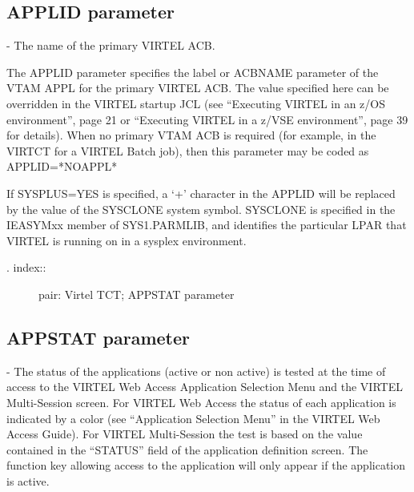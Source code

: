 \documentclass[letterpaper,10pt,english]{sphinxmanual}
\begin{document}
\subsection{APPLID parameter}
\label{\detokenize{Installation_Guide:id4}}
\begin{sphinxVerbatim}[commandchars=\\\{\}]
 
\end{sphinxVerbatim}

 - The name of the primary VIRTEL ACB.

The APPLID parameter specifies the label or ACBNAME parameter of the VTAM APPL for the primary VIRTEL ACB. The value specified here can be overridden in the VIRTEL startup JCL (see “Executing VIRTEL in an z/OS environment”, page 21 or “Executing VIRTEL in a z/VSE environment”, page 39 for details). When no primary VTAM ACB is required (for example, in the VIRTCT for a VIRTEL Batch job), then this parameter may be coded as APPLID=*NOAPPL*

If SYSPLUS=YES is specified, a ‘+’ character in the APPLID will be replaced by the value of the SYSCLONE system symbol. SYSCLONE is specified in the IEASYMxx member of SYS1.PARMLIB, and identifies the particular LPAR that VIRTEL is running on in a sysplex environment.
\begin{description}
\item[{. index::}] \leavevmode
pair: Virtel TCT; APPSTAT parameter

\end{description}


\subsection{APPSTAT parameter}
\label{\detokenize{Installation_Guide:appstat-parameter}}
\begin{sphinxVerbatim}[commandchars=\\\{\}]
 
\end{sphinxVerbatim}

 - The status of the applications (active or non active) is tested at the time of access to the VIRTEL Web Access Application Selection Menu and the VIRTEL Multi-Session screen. For VIRTEL Web Access the status of each application is indicated by a color (see “Application Selection Menu” in the VIRTEL Web Access Guide). For VIRTEL Multi-Session the test is based on the value contained in the “STATUS” field of the application definition screen. The function key allowing access to the application will only appear if the application is active.
\end{document}

